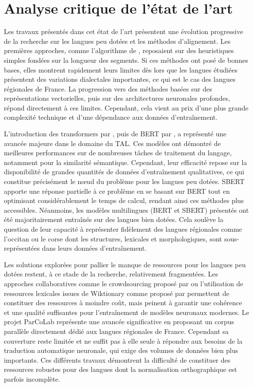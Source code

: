 \chapter{Analyse critique de l'état de l'art}

Les travaux présentés dans cet état de l'art présentent une évolution progressive de la
recherche sur les langues peu dotées et les méthodes d'alignement. Les premières approches, comme l'algorithme
de \citet{gale_1991}, reposaient sur des heuristiques simples fondées sur la longueur des segments. Si ces
méthodes ont posé de bonnes bases, elles montrent rapidement leurs limites dès lors que les langues étudiées
présentent des variations dialectales importantes, ce qui est le cas des langues régionales de
France. La progression vers des méthodes basées sur des représentations vectorielles, puis sur des
architectures neuronales profondes, répond directement à ces limites. Cependant, cela vient au prix d'une plus grande
complexité technique et d'une dépendance aux données d'entraînement.

L'introduction des transformers par \citet{vaswani_2017}, puis de BERT par \citet{devlin_2019}, a représenté
une avancée majeure dans le domaine du TAL. Ces modèles ont démontré de meilleures performances sur de
nombreuses tâches de traitement du langage, notamment pour la similarité sémantique. Cependant,
leur efficacité repose sur la disponibilité de grandes quantités de données d'entraînement qualitatives,
ce qui constitue précisément le nœud du problème pour les langues peu dotées. SBERT \citep{reimers_2019}
apporte une réponse partielle à ce problème en se basant sur BERT tout en optimisant considérablement le temps de calcul, rendant ainsi ces
méthodes plus accessibles. Néanmoins, les modèles multilingues (BERT et SBERT) présentés ont été
majoritairement entraînés sur des langues bien dotées. Cela soulève la question de leur capacité à
représenter fidèlement des langues régionales comme l'occitan ou le corse dont les structures, lexicales et
morphologiques, sont sous-représentées dans leurs données d'entraînement.

Les solutions explorées pour pallier le manque de ressources pour les langues peu dotées restent, à ce stade
de la recherche, relativement fragmentées. Les approches collaboratives comme le crowdsourcing proposé par
\citet{millour_2018} ou l'utilisation de ressources lexicales issues de Wiktionary comme proposé par
\citet{miletic_2018} permettent de constituer des ressources à moindre coût, mais peinent à garantir
une cohérence et une qualité suffisantes pour l'entraînement de modèles neuronaux modernes.
Le projet ParCoLab \citep{stosic_2024} représente une avancée significative en proposant un corpus parallèle
directement dédié aux langues régionales de France. Cependant sa couverture reste limitée et ne suffit pas à
elle seule à répondre aux besoins de la traduction automatique neuronale, qui exige des volumes de données
bien plus importants. Ces différents travaux démontrent la difficulté de constituer des
ressources robustes pour des langues dont la normalisation orthographique est parfois incomplète.

